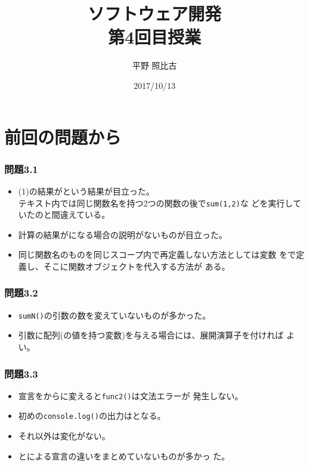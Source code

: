 
%
\title{ソフトウェア開発\\第4回目授業}
\author{平野 照比古}
\institute{}
\date{2017/10/13}

\frame{\maketitle}
\section{前回の問題から}
 \begin{frame}[containsverbatim]
  \frametitle{問題3.1}
  \begin{itemize}
   \item (1)の結果がという結果が目立った。\\
         テキスト内では同じ関数名を持つ2つの関数の後で\Verb+sum(1,2)+な
         どを実行していたのと間違えている。
   \item 計算の結果がになる場合の説明がないものが目立った。
   \item 同じ関数名のものを同じスコープ内で再定義しない方法としては変数
         をで定義し、そこに関数オブジェクトを代入する方法が
         ある。
  \end{itemize}
 \end{frame}
\begin{frame}[containsverbatim]
 \frametitle{問題3.2}
 \begin{itemize}
  \item \texttt{sumN()}の引数の数を変えていないものが多かった。
  \item 引数に配列(の値を持つ変数)を与える場合には、展開演算子を付ければ
        よい。
 \end{itemize}
\end{frame}
\begin{frame}[containsverbatim]
 \frametitle{問題3.3}
 \begin{itemize}
  \item 宣言をからに変えると\texttt{func2()}は文法エラーが
 発生しない。
  \item 初めの\Verb+console.log()+の出力はとなる。
  \item それ以外は変化がない。
  \item {}とによる宣言の違いをまとめていないものが多かっ
        た。
 \end{itemize}
\end{frame}
